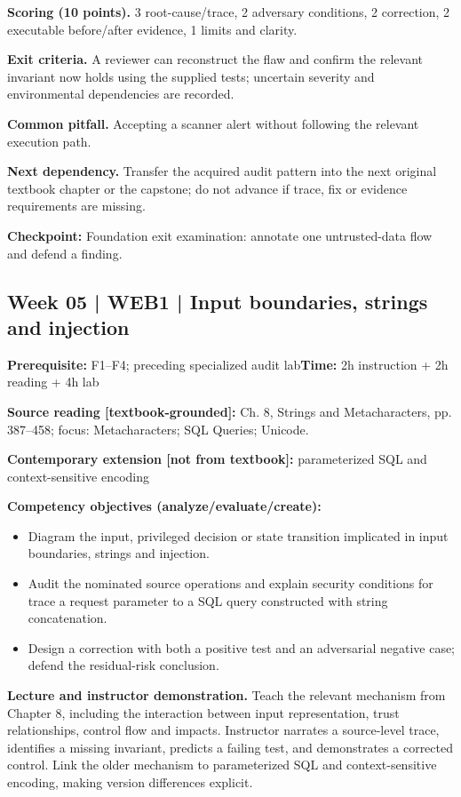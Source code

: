 \documentclass[10pt,letterpaper]{article}
\begin{document}
\textbf{Scoring (10 points).} 3 root-cause/trace, 2 adversary conditions, 2 correction, 2 executable before/after evidence, 1 limits and clarity.

\textbf{Exit criteria.} A reviewer can reconstruct the flaw and confirm the relevant invariant now holds using the supplied tests; uncertain severity and environmental dependencies are recorded.

\textbf{Common pitfall.} Accepting a scanner alert without following the relevant execution path.

\textbf{Next dependency.} Transfer the acquired audit pattern into the next original textbook chapter or the capstone; do not advance if trace, fix or evidence requirements are missing.

\begin{historynote}\textbf{Checkpoint:} Foundation exit examination: annotate one untrusted-data flow and defend a finding.\end{historynote}
\subsection{Week 05 | WEB1 | Input boundaries, strings and injection}
\textbf{Prerequisite:} F1--F4; preceding specialized audit lab\hfill\textbf{Time:} 2h instruction + 2h reading + 4h lab

\textbf{Source reading [textbook-grounded]:} Ch. 8, Strings and Metacharacters, pp. 387--458; focus: Metacharacters; SQL Queries; Unicode.

\textbf{Contemporary extension [not from textbook]:} parameterized SQL and context-sensitive encoding

\textbf{Competency objectives (analyze/evaluate/create):}
\begin{itemize}[leftmargin=*,itemsep=2pt]
\item Diagram the input, privileged decision or state transition implicated in input boundaries, strings and injection.
\item Audit the nominated source operations and explain security conditions for trace a request parameter to a SQL query constructed with string concatenation.
\item Design a correction with both a positive test and an adversarial negative case; defend the residual-risk conclusion.
\end{itemize}
\textbf{Lecture and instructor demonstration.} Teach the relevant mechanism from Chapter 8, including the interaction between input representation, trust relationships, control flow and impacts. Instructor narrates a source-level trace, identifies a missing invariant, predicts a failing test, and demonstrates a corrected control. Link the older mechanism to parameterized SQL and context-sensitive encoding, making version differences explicit.
\end{document}
